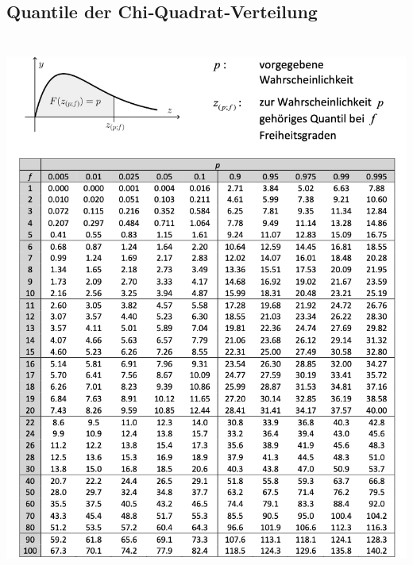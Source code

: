 \documentclass[8pt,a4paper]{scrartcl}
\begin{document}
\begin{multicols*}{2}
	\subsection{Quantile der Chi‐Quadrat‐Verteilung}
		\includegraphics[height=18cm]{img/QuantileChi.png}

\end{multicols*}
\end{document}
